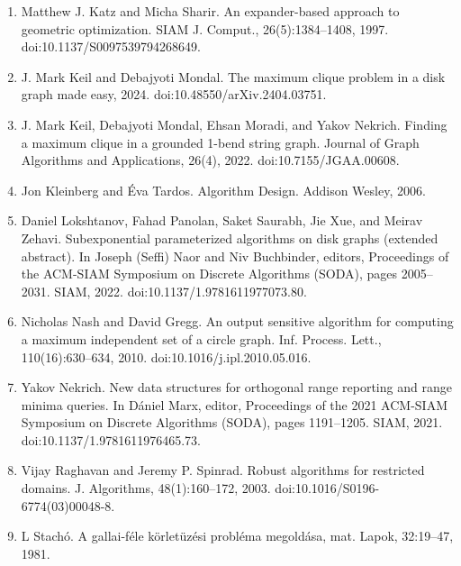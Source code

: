 \documentclass[10pt,a4paper]{amsart}
\begin{document}
\begin{enumerate}
\item[]  [31]  Matthew J. Katz and Micha Sharir.  An expander-based approach to geometric optimization.  SIAM J. Comput., 26(5):1384–1408, 1997.  doi:10.1137/S0097539794268649.  
\item[]  [32]  J. Mark Keil and Debajyoti Mondal.  The maximum clique problem in a disk graph made easy, 2024.  doi:10.48550/arXiv.2404.03751.  
\item[]  [33]  J. Mark Keil, Debajyoti Mondal, Ehsan Moradi, and Yakov Nekrich.  Finding a maximum clique in a grounded 1-bend string graph.  Journal of Graph Algorithms and Applications, 26(4), 2022.  doi:10.7155/JGAA.00608.  
\item[]  [34]  Jon Kleinberg and Éva Tardos.  Algorithm Design.  Addison Wesley, 2006.  
\item[]  [35]  Daniel Lokshtanov, Fahad Panolan, Saket Saurabh, Jie Xue, and Meirav Zehavi.  Subexponential parameterized algorithms on disk graphs (extended abstract).  In Joseph (Seffi) Naor and Niv Buchbinder, editors, Proceedings of the ACM-SIAM Symposium on Discrete Algorithms (SODA), pages 2005–2031. SIAM, 2022.  doi:10.1137/1.9781611977073.80.  
\item[]  [36]  Nicholas Nash and David Gregg.  An output sensitive algorithm for computing a maximum independent set of a circle graph.  Inf. Process. Lett., 110(16):630–634, 2010.  doi:10.1016/j.ipl.2010.05.016.  
\item[]  [37]  Yakov Nekrich.  New data structures for orthogonal range reporting and range minima queries.  In Dániel Marx, editor, Proceedings of the 2021 ACM-SIAM Symposium on Discrete Algorithms (SODA), pages 1191–1205. SIAM, 2021.  doi:10.1137/1.9781611976465.73.  
\item[]  [38]  Vijay Raghavan and Jeremy P. Spinrad.  Robust algorithms for restricted domains.  J. Algorithms, 48(1):160–172, 2003.  doi:10.1016/S0196-6774(03)00048-8.  
\item[]  [39]  L Stachó.  A gallai-féle körletüzési probléma megoldása, mat.  Lapok, 32:19–47, 1981.  
\end{enumerate}
\par
\end{document}
